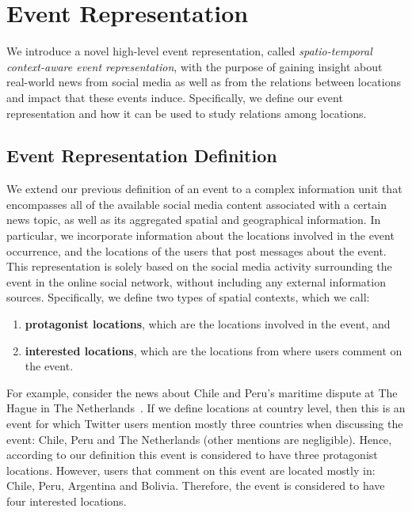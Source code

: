 \section{Event Representation}\label{sec:geo:model}

We introduce a novel high-level event representation, called {\em
spatio-temporal context-aware event representation}, with the purpose of gaining
insight about real-world news from social media as well as from the relations
between locations and impact that these events induce. 
%
Specifically, we define our event representation and how it can be used to study
relations among locations.

\subsection{Event Representation Definition}\label{sec:model_definition}

We extend our previous definition of an event to a complex information unit that
encompasses all of the available social media content associated with a certain
news topic, as well as its aggregated spatial and geographical information.
%
%
%
In particular, we incorporate information about the locations involved in the
event occurrence, and the locations of the users that post messages about the
event. 
%
This representation is solely based on the social media activity surrounding the
event in the online social network, without including any external information
sources.
%
Specifically, we define two types of spatial contexts, which we call:
\begin{enumerate}
\item {\bf protagonist locations}, which are the locations involved in the
event, and
\item {\bf interested locations}, which are the locations from where users
comment on the event.
\end{enumerate}

For example, consider the news about Chile and Peru's maritime dispute at The
Hague in The Netherlands~\cite{bbc_peruchile}. 
%
If we define locations at country level, then this is an event for which Twitter
users mention mostly three countries when discussing the event: Chile, Peru and
The Netherlands (other mentions are negligible). 
%
Hence, according to our definition this event is considered to have three
protagonist locations. 
%
However, users that comment on this event are located mostly in: Chile, Peru,
Argentina and Bolivia. 
%
Therefore, the event is considered to have four interested locations.

